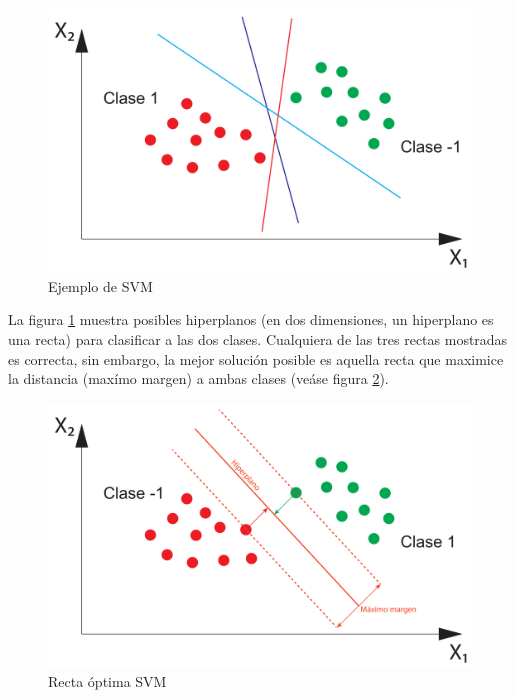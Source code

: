 \begin{figure}[H]
	\centering
	\captionsetup{justification=centering}
	\includegraphics[width=\textwidth]{imagenes/marco_teorico/SVM/svm_ejemplo1.pdf}
	\caption{Ejemplo de SVM}
	\label{fig:svm_ejemplo1}
\end{figure}

La figura \ref{fig:svm_ejemplo1} muestra posibles hiperplanos (en dos dimensiones, un hiperplano es una recta) para clasificar a las dos clases. Cualquiera de las tres rectas mostradas es correcta, sin embargo, la mejor solución posible es aquella recta que maximice la distancia (maxímo margen) a ambas clases (veáse figura \ref{fig:svm_ejemplo2}).

\begin{figure}[H]
	\centering
	\captionsetup{justification=centering}
	\includegraphics[width=\textwidth]{imagenes/marco_teorico/SVM/svm_ejemplo2.pdf}
	\caption{Recta óptima SVM}
	\label{fig:svm_ejemplo2}
\end{figure}

